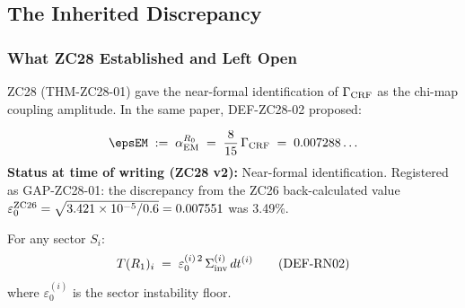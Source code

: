 \documentclass[12pt, a4paper]{article}
\begin{document}
\begin{abstract}
A post-publication audit (FIND-ZC37-02, v1.2 expanded) traces
$\epscan$ from its foundational origin (Part~A, EIC toy model:
SINDy inference of $I_{\rm eff} = 0.7007$ from the EIC field
equation, registered as the ``Instability Floor'') through
its propagation as DEF-TLS-02 (Part~C, ZC18 Track A) and into
the downstream witnesses Part~B ($D_0 = 1-n\varepsilon_0 = 0.9396$,
$T_{\rm avg} = 35.42$), ZC33 (sector physical times $t_i$),
and ZC36 (Fiedler $F = 1.524587$ via Route A). All five
witnesses are numerically consistent with $\epscan$ from the
start. DEF-ZC28-02 was an orphan registration that never
propagated into a downstream numerical substitution.
THM-ZC37-01 therefore restores global Z-Programme consistency
rather than introducing new content to CRF; only the ZC28
registration line changes. The omission of $\epscan$ from
ZC28's FIND-ZC28-03 elimination table is registered as a
separate scar (PM-ZC37-02), confirming Pre-Work Audit Protocol
step PWA-3 (scan Part B/C/D before declaring uniqueness) as
load-bearing.
\end{abstract}

\tableofcontents
\newpage

\subsection{The Inherited Discrepancy}
\label{sec:background}

\subsubsection{What ZC28 Established and Left Open}

ZC28 (THM-ZC28-01) gave the near-formal identification of
$\Gamma_{\rm CRF}$ as the chi-map coupling amplitude. In
the same paper, DEF-ZC28-02 proposed:

\begin{formalbox}[title={DEF-ZC28-02 (Inherited from ZC28 v2 ---
  RETIRED here as PM-ZC37-01)}]
\[
  \epsEM \;:=\; \alpha_{\rm EM}^{R_0}
  \;=\; \frac{8}{15}\,\Gamma_{\rm CRF}
  \;=\; 0.007288\ldots
\]
\textbf{Status at time of writing (ZC28 v2):}
Near-formal identification. Registered as GAP-ZC28-01:
the discrepancy from the ZC26 back-calculated value
$\varepsilon_0^{\rm ZC26} = \sqrt{3.421\times10^{-5}/0.6}
= 0.007551$ was 3.49\%.
\end{formalbox}

\begin{formalbox}[title={Inherited DEF-RN02 (Part C, recalled):
  The R1-layer cost formula}]
For any sector $S_i$:
\begin{equation}
  T(R_1)_i \;=\; \varepsilon_0^{(i)\,2}\,\Sigma_{\rm inv}^{(i)}\,dt^{(i)}
  \tag{DEF-RN02}\label{eq:def-rn02}
\end{equation}
where $\varepsilon_0^{(i)}$ is the sector instability floor.
\end{formalbox}
\end{document}
